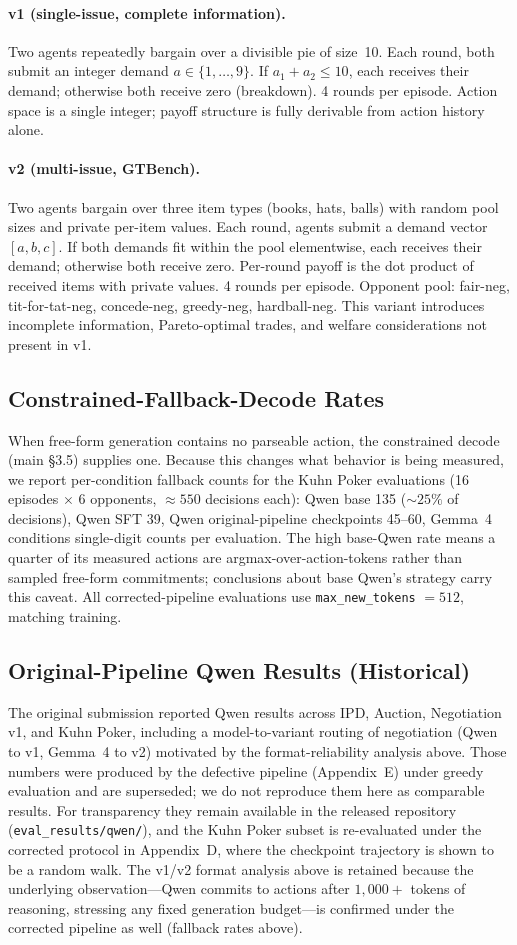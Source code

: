 \documentclass[letterpaper]{article} %
\begin{document}
\paragraph{v1 (single-issue, complete information).} Two agents repeatedly bargain over a divisible pie of size~10. Each round, both submit an integer demand $a \in \{1,\dots,9\}$. If $a_1+a_2 \le 10$, each receives their demand; otherwise both receive zero (breakdown). 4 rounds per episode. Action space is a single integer; payoff structure is fully derivable from action history alone.
\paragraph{v2 (multi-issue, GTBench).} Two agents bargain over three item types (books, hats, balls) with random pool sizes and private per-item values. Each round, agents submit a demand vector $[a, b, c]$. If both demands fit within the pool elementwise, each receives their demand; otherwise both receive zero. Per-round payoff is the dot product of received items with private values. 4 rounds per episode. Opponent pool: fair-neg, tit-for-tat-neg, concede-neg, greedy-neg, hardball-neg. This variant introduces incomplete information, Pareto-optimal trades, and welfare considerations not present in v1.
\subsection{Constrained-Fallback-Decode Rates}
When free-form generation contains no parseable action, the constrained decode (main \S3.5) supplies one. Because this changes what behavior is being measured, we report per-condition fallback counts for the Kuhn Poker evaluations (16 episodes $\times$ 6 opponents, ${\approx}550$ decisions each): Qwen base 135 (${\sim}25\%$ of decisions), Qwen SFT 39, Qwen original-pipeline checkpoints 45--60, Gemma~4 conditions single-digit counts per evaluation. The high base-Qwen rate means a quarter of its measured actions are argmax-over-action-tokens rather than sampled free-form commitments; conclusions about base Qwen's strategy carry this caveat. All corrected-pipeline evaluations use \texttt{max\_new\_tokens} $= 512$, matching training.
\subsection{Original-Pipeline Qwen Results (Historical)}
The original submission reported Qwen results across IPD, Auction, Negotiation v1, and Kuhn Poker, including a model-to-variant routing of negotiation (Qwen to v1, Gemma~4 to v2) motivated by the format-reliability analysis above. Those numbers were produced by the defective pipeline (Appendix~E) under greedy evaluation and are superseded; we do not reproduce them here as comparable results. For transparency they remain available in the released repository (\texttt{eval\_results/qwen/}), and the Kuhn Poker subset is re-evaluated under the corrected protocol in Appendix~D, where the checkpoint trajectory is shown to be a random walk. The v1/v2 format analysis above is retained because the underlying observation---Qwen commits to actions after $1{,}000+$ tokens of reasoning, stressing any fixed generation budget---is confirmed under the corrected pipeline as well (fallback rates above).
\end{document}
